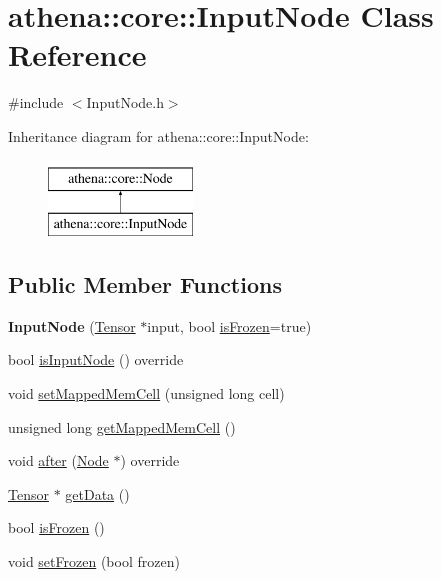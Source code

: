 \hypertarget{classathena_1_1core_1_1_input_node}{}\section{athena\+:\+:core\+:\+:Input\+Node Class Reference}
\label{classathena_1_1core_1_1_input_node}


{\ttfamily \#include $<$Input\+Node.\+h$>$}

Inheritance diagram for athena\+:\+:core\+:\+:Input\+Node\+:\begin{figure}[H]
\begin{center}
\leavevmode
\includegraphics[height=2.000000cm]{classathena_1_1core_1_1_input_node}
\end{center}
\end{figure}
\subsection*{Public Member Functions}
\begin{DoxyCompactItemize}
\item 
\mbox{\label{classathena_1_1core_1_1_input_node_a14987336678cfcbc2ddbd3f6b67bb572}} 
{\bfseries Input\+Node} (\mbox{\hyperlink{classathena_1_1core_1_1_tensor}{Tensor}} $\ast$input, bool \mbox{\hyperlink{classathena_1_1core_1_1_input_node_a4be7482bcf2e56ea3fd03a2bf79be074}{is\+Frozen}}=true)
\item 
bool \mbox{\hyperlink{classathena_1_1core_1_1_input_node_a2548b569a336b75c0005295833052979}{is\+Input\+Node}} () override
\item 
void \mbox{\hyperlink{classathena_1_1core_1_1_input_node_a8c17ce96d989454e6316c1c049c2c98d}{set\+Mapped\+Mem\+Cell}} (unsigned long cell)
\item 
unsigned long \mbox{\hyperlink{classathena_1_1core_1_1_input_node_acebc0cbf077eaae99f5c11cfba608533}{get\+Mapped\+Mem\+Cell}} ()
\item 
void \mbox{\hyperlink{classathena_1_1core_1_1_input_node_aaec12f4c76b6d9890efe1fb4337a1b61}{after}} (\mbox{\hyperlink{classathena_1_1core_1_1_node}{Node}} $\ast$) override
\item 
\mbox{\hyperlink{classathena_1_1core_1_1_tensor}{Tensor}} $\ast$ \mbox{\hyperlink{classathena_1_1core_1_1_input_node_a983588a56beeb817a59cf9b7e4a63b55}{get\+Data}} ()
\item 
bool \mbox{\hyperlink{classathena_1_1core_1_1_input_node_a4be7482bcf2e56ea3fd03a2bf79be074}{is\+Frozen}} ()
\item 
void \mbox{\hyperlink{classathena_1_1core_1_1_input_node_a45311e1bbff5dd28df3c3877aaa10109}{set\+Frozen}} (bool frozen)
\end{DoxyCompactItemize}

